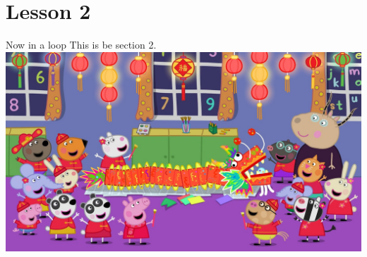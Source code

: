 \documentclass[../main.tex]{subfiles}
\begin{document}
\section{Lesson 2}

Now in a loop
This is be section 2.\\

\includegraphics[width = \linewidth]{images/peppaPig.jpg}
\end{document}
